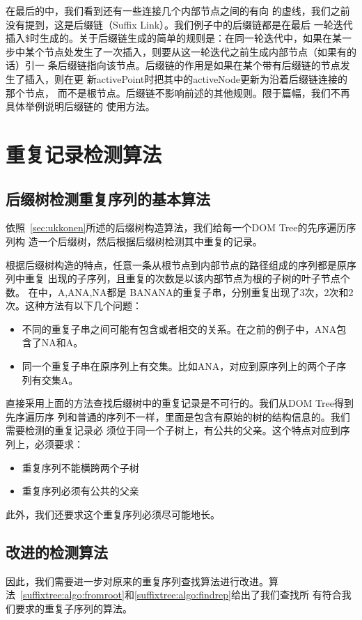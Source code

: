 在最后的中，我们看到还有一些连接几个内部节点之间的有向
的虚线，我们之前没有提到，这是后缀链（Suffix Link）。我们例子中的后缀链都是在最后
一轮迭代插入\$时生成的。关于后缀链生成的简单的规则是：在同一轮迭代中，如果在某一
步中某个节点处发生了一次插入，则要从这一轮迭代之前生成内部节点（如果有的话）引一
条后缀链指向该节点。后缀链的作用是如果在某个带有后缀链的节点发生了插入，则在更
新{activePoint}时把其中的{activeNode}更新为沿着后缀链连接的那个节点，
而不是根节点。后缀链不影响前述的其他规则。限于篇幅，我们不再具体举例说明后缀链的
使用方法。

\section{重复记录检测算法}
\label{sec:multipldetect}

\subsection{后缀树检测重复序列的基本算法}
依照~\ref{sec:ukkonen}所述的后缀树构造算法，我们给每一个DOM Tree的先序遍历序列构
造一个后缀树，然后根据后缀树检测其中重复的记录。

根据后缀树构造的特点，任意一条从根节点到内部节点的路径组成的序列都是原序列中重复
出现的子序列，且重复的次数是以该内部节点为根的子树的叶子节点个数。
在中，{A},{ANA},{NA}都是
{BANANA}的重复子串，分别重复出现了3次，2次和2次。这种方法有以下几个问题：
\begin{itemize}
\item 不同的重复子串之间可能有包含或者相交的关系。在之前的例子中，{ANA}包
  含了{NA}和{A}。
\item 同一个重复子串在原序列上有交集。比如{ANA}，对应到原序列上的两个子序
  列有交集{A}。  
\end{itemize}

直接采用上面的方法查找后缀树中的重复记录是不可行的。我们从DOM Tree得到先序遍历序
列和普通的序列不一样，里面是包含有原始的树的结构信息的。我们需要检测的重复记录必
须位于同一个子树上，有公共的父亲。这个特点对应到序列上，必须要求：
\begin{itemize}
\item 重复序列不能横跨两个子树
\item 重复序列必须有公共的父亲
\end{itemize}

此外，我们还要求这个重复序列必须尽可能地长。

\subsection{改进的检测算法}
因此，我们需要进一步对原来的重复序列查找算法进行改进。算
法~\ref{suffixtree:algo:fromroot}和\ref{suffixtree:algo:findrep}给出了我们查找所
有符合我们要求的重复子序列的算法。


